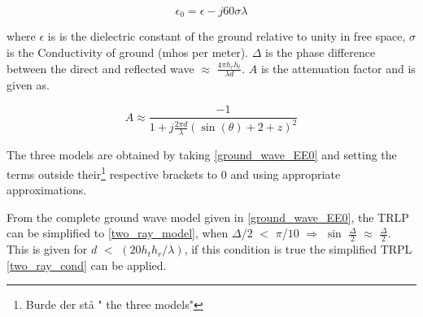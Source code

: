 \begin{equation}
\epsilon_{0} = \epsilon-j60\sigma \lambda
\label{eps_0}
\end{equation}

where $\epsilon$ is is the dielectric constant of the ground relative to
unity in free space, $\sigma$ is the Conductivity of ground (mhos per meter). $\Delta$ is the phase difference between the direct and reflected wave $\approx$ $\frac{4\pi h_{r} h_{t}}{\lambda d}$. $A$ is the attenuation factor and is given as.

\begin{equation}
A \approx \frac{-1}{1+j\frac{2\pi d}{\lambda}(\sin(\theta)+2+z)^{2}}
\label{attenuation_factor_A}
\end{equation}





The three models are obtained by taking \eqref{ground_wave_EE0} and setting the terms outside their\footnote{Burde der stå " the three models"} respective brackets to 0 and using appropriate approximations.

From the complete ground wave model given in \eqref{ground_wave_EE0}, the TRLP can be simplified to \eqref{two_ray_model}, 
when $\Delta$/$2$ $<$ $\pi$/$10$ $\Rightarrow$ $\sin$ $\frac{\Delta}{2}$ $\approx$ $\frac{\Delta}{2}$. This is given for $d$ $<$ $(20h_{t}h_{r}/\lambda)$, if this condition is true the simplified TRPL \eqref{two_ray_cond} can be applied.  
  
  
















